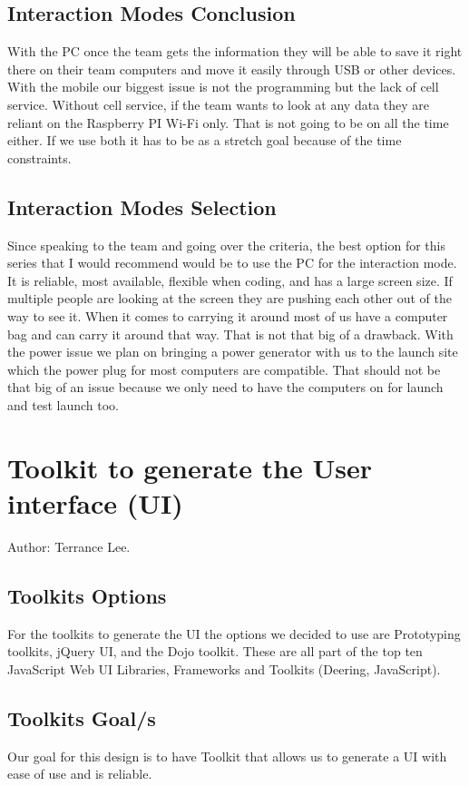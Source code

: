 \documentclass[10pt,draftclsnofoot,onecolumn]{IEEEtran}
\begin{document}
    	\subsection{Interaction Modes Conclusion}
     	With the PC once the team gets the information they will be able to save it right there on their team computers and move it
	easily through USB or other devices. 
	With the mobile our biggest issue is not the programming but the lack of cell service.
	Without cell service, if the team wants to look at any data they are reliant on the Raspberry PI Wi-Fi only. 
	That is not going to be on all the time either. 
	If we use both it has to be as a stretch goal because of the time constraints.  
     	\subsection{Interaction Modes Selection}
      	Since speaking to the team and going over the criteria, the best option for this series that I would recommend would be to use
	the PC for the interaction mode. 
	It is reliable, most available, flexible when coding, and has a large screen size. 
	If multiple people are looking at the screen they are pushing each other out of the way to see it. 
	When it comes to carrying it around most of us have a computer bag and can carry it around that way. 
	That is not that big of a drawback. 
	With the power issue we plan on bringing a power generator with us to the launch site which the power plug for most computers
	are compatible. 
	That should not be that big of an issue because we only need to have the computers on for launch and test launch too.
        \section{  Toolkit to generate the User interface (UI)}
	Author: Terrance Lee.
	\subsection{Toolkits Options}
 	For the toolkits to generate the UI the options we decided to use are Prototyping toolkits, jQuery UI, and the Dojo toolkit.
	These are all part of the top ten JavaScript Web UI Libraries, Frameworks and Toolkits (Deering, JavaScript).  

 	\subsection{Toolkits Goal/s}
  	Our goal for this design is to have Toolkit that allows us to generate a UI with ease of use and is reliable.
\end{document}
